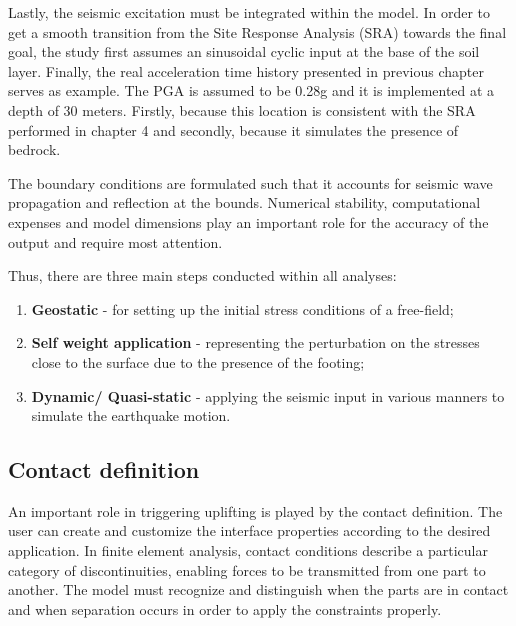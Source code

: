 Lastly, the seismic excitation must be integrated within the model. In order to get a smooth transition from the Site Response Analysis (SRA) towards the final goal, the study first assumes an sinusoidal cyclic input at the base of the soil layer. Finally, the real acceleration time history presented in previous chapter serves as example. The PGA is assumed to be 0.28g and it is implemented at a depth of 30 meters. Firstly, because this location is consistent with the SRA performed in chapter 4 and secondly, because it simulates the presence of bedrock.

The boundary conditions are formulated such that it accounts for seismic wave propagation and reflection at the bounds. Numerical stability, computational expenses and model dimensions play an important role for the accuracy of the output and require most attention.  %

Thus, there are three main steps conducted within all analyses:
\begin{enumerate}
	\item \textbf{Geostatic} - for setting up the initial stress conditions of a free-field;
	\item \textbf{Self weight application} - representing the perturbation on the stresses close to the surface due to the presence of the footing;
	\item \textbf{Dynamic/ Quasi-static} - applying the seismic input in various manners to simulate the earthquake motion.
\end{enumerate}

\subsection{Contact definition}
An important role in triggering uplifting is played by the contact definition. The user can create and customize the interface properties according to the desired application. In finite element analysis, contact conditions describe a particular category of discontinuities, enabling forces to be transmitted from one part to another. The model must recognize and distinguish when the parts are in contact and when separation occurs in order to apply the constraints properly. 

